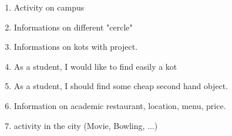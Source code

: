 \documentclass{article}
\begin{document}
\begin{enumerate}
\item Activity on campus
\item Informations on different "cercle"
\item Informations on kots with project.
\item As a student, I would like to find easily a kot
\item As a student, I should find some cheap second hand object.

\item Information on academic restaurant, location, menu, price.

\item activity in the city (Movie, Bowling, ...)
	


\end{enumerate}
\end{document}
